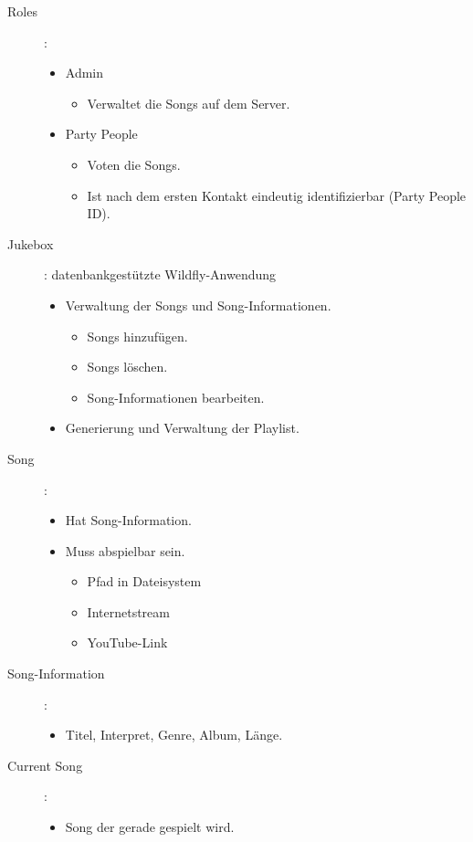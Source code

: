 \begin{description}
	\item [Roles]:
	\begin{itemize}
		\item Admin
			\begin{itemize}
				\item Verwaltet die Songs auf dem Server.
			\end{itemize}
		\item Party People
			\begin{itemize}
				\item Voten die Songs.
				\item Ist nach dem ersten Kontakt eindeutig identifizierbar (Party People ID).
			\end{itemize}
	\end{itemize}
	\item [Jukebox]: datenbankgestützte Wildfly-Anwendung
	\begin{itemize}
		\item Verwaltung der Songs und Song-Informationen.
			\begin{itemize}
				\item Songs hinzufügen.
				\item Songs löschen.
				\item Song-Informationen bearbeiten.
			\end{itemize}
		\item Generierung und Verwaltung der Playlist.
	\end{itemize}
	\item [Song]:
		\begin{itemize}
			\item Hat Song-Information.
			\item Muss abspielbar sein.
				\begin{itemize}
					\item Pfad in Dateisystem
					\item Internetstream
					\item YouTube-Link
				\end{itemize}
		\end{itemize}
	\item [Song-Information]:
		\begin{itemize}
			\item Titel, Interpret, Genre, Album, Länge.
		\end{itemize}
	\item [Current Song]:
		\begin{itemize}
			\item Song der gerade gespielt wird.

\end{itemize}
\end{description}
